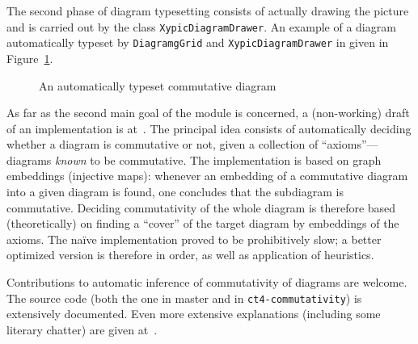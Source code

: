 The second phase of diagram typesetting consists of actually drawing the picture
and is carried out by the class \texttt{XypicDiagramDrawer}.  An example of a
diagram automatically typeset by \texttt{DiagramgGrid} and
\texttt{XypicDiagramDrawer} in given in Figure~\ref{fig:cat:loops}.
\begin{figure}[h]
  \centerline{
  }
  \caption{An automatically typeset commutative diagram}
  \label{fig:cat:loops}
\end{figure}

As far as the second main goal of the module is concerned, a (non-working) draft
of an implementation is at~\cite{ct4commutativity}.  The principal idea consists
of automatically deciding whether a diagram is commutative or not, given a
collection of ``axioms''---diagrams \textit{known} to be commutative.  The
implementation is based on graph embeddings (injective maps): whenever an
embedding of a commutative diagram into a given diagram is found, one concludes
that the subdiagram is commutative.  Deciding commutativity of the whole diagram
is therefore based (theoretically) on finding a ``cover'' of the target diagram
by embeddings of the axioms.  The na\"{i}ve implementation proved to be
prohibitively slow; a better optimized version is therefore in order, as well as
application of heuristics.

Contributions to automatic inference of commutativity of diagrams are welcome.
The source code (both the one in master and in \texttt{ct4-commutativity}) is
extensively documented.  Even more extensive explanations (including some
literary chatter) are given at~\cite{scolobb}.
